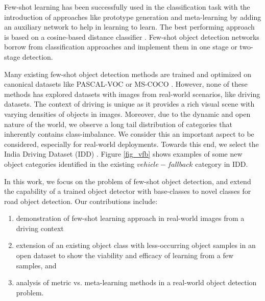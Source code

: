 \documentclass[letterpaper]{article} %
\begin{document}
Few-shot learning has been successfully used in the classification task \cite{matching-net,protonet,maml} with the introduction of approaches like prototype generation and meta-learning by adding an auxiliary network to help in learning to learn.  The best performing approach is based on a cosine-based distance classifier \cite{matching-net}. Few-shot object detection networks borrow from classification approaches and implement them in one stage \cite{reweight} or two-stage \cite{metarcnn,addfeat,fsdet} detection.

Many existing few-shot object detection methods are trained and optimized on canonical datasets like PASCAL-VOC \cite{voc} or MS-COCO \cite{coco}. However, none of these methods has explored datasets with  images from real-world scenarios, like driving datasets. The context of driving is unique as it provides a rich visual scene with varying densities of objects in images. Moreover, due to the dynamic and open nature of the world, we observe a long tail distribution of categories that inherently contains class-imbalance. We consider this an important aspect to be considered, especially for real-world deployments. Towards this end, we select the India Driving Dataset (IDD) \cite{idd}. Figure \ref{fig_vfb} shows examples of some new object categories identified in the existing $vehicle-fallback$ category in IDD.

In this work, we focus on the problem of few-shot object detection, and extend the capability of a trained object detector with base-classes to novel classes for road object detection. Our contributions include:
\begin{enumerate}
    \item demonstration of few-shot learning approach in real-world images from a driving context 
    \item extension of an existing object class with less-occurring object samples in an open dataset to  show the viability and efficacy of learning from a few samples, and
    \item analysis of metric vs. meta-learning methods in a real-world object detection problem.
\end{enumerate}
\end{document}
